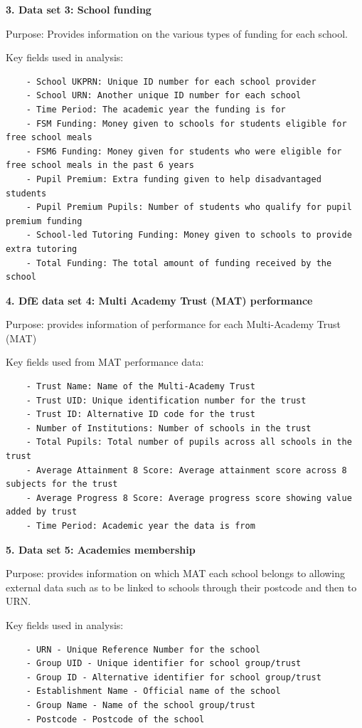 \documentclass[
  letterpaper,
  DIV=11,
  numbers=noendperiod]{scrartcl}
\begin{document}
\textbf{3. Data set 3: School funding}

Purpose: Provides information on the various types of funding for each
school.

Key fields used in analysis:

\begin{verbatim}
    - School UKPRN: Unique ID number for each school provider
    - School URN: Another unique ID number for each school
    - Time Period: The academic year the funding is for
    - FSM Funding: Money given to schools for students eligible for free school meals
    - FSM6 Funding: Money given for students who were eligible for free school meals in the past 6 years
    - Pupil Premium: Extra funding given to help disadvantaged students
    - Pupil Premium Pupils: Number of students who qualify for pupil premium funding
    - School-led Tutoring Funding: Money given to schools to provide extra tutoring
    - Total Funding: The total amount of funding received by the school
\end{verbatim}

\textbf{4. DfE data set 4: Multi Academy Trust (MAT) performance}

Purpose: provides information of performance for each Multi-Academy
Trust (MAT)

Key fields used from MAT performance data:

\begin{verbatim}
    - Trust Name: Name of the Multi-Academy Trust
    - Trust UID: Unique identification number for the trust
    - Trust ID: Alternative ID code for the trust
    - Number of Institutions: Number of schools in the trust
    - Total Pupils: Total number of pupils across all schools in the trust
    - Average Attainment 8 Score: Average attainment score across 8 subjects for the trust
    - Average Progress 8 Score: Average progress score showing value added by trust
    - Time Period: Academic year the data is from
\end{verbatim}

\textbf{5. Data set 5: Academies membership}

Purpose: provides information on which MAT each school belongs to
allowing external data such as to be linked to schools through their
postcode and then to URN.

Key fields used in analysis:

\begin{verbatim}
    - URN - Unique Reference Number for the school
    - Group UID - Unique identifier for school group/trust
    - Group ID - Alternative identifier for school group/trust  
    - Establishment Name - Official name of the school
    - Group Name - Name of the school group/trust
    - Postcode - Postcode of the school
\end{verbatim}
\end{document}
